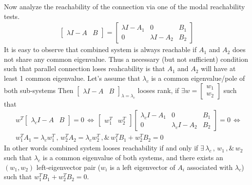 \documentclass[twoside]{article}
\begin{document}
Now analyze the reachability of the connection via one of the modal reachability tests. 
%
\begin{align*}
	\left[ \begin{array}{c|c} \lambda I - A & B \end{array} \right]
	= 
	\left[ \begin{array}{c|c|c} \lambda I - A_1 & 0 & B_1 \\ \hline 0 &  \lambda I - A_2 & B_2 
	\end{array} \right]
\end{align*}
%
It is easy to observe that combined system is always reachable if $A_1$ 
and $A_2$ does not share any common eigenvalue. Thus a necessary (but not sufficient) condition 
such that parallel connection loses reahcability is that $A_1$ and $A_2$ will have at least 1 
common eigenvalue. Let's assume that $\lambda_c$ is a common eigenvalue/pole of both sub-systems
Then $\left[ \begin{array}{c|c} \lambda I - A & B \end{array} \right]_{\lambda = \lambda_c}$ 
looses rank, if $\exists w = \begin{bmatrix} w_1 \\ w_2 \end{bmatrix}$ such that 
%
%
\begin{align*}
	&w^T \left[ \begin{array}{c|c} \lambda_c I - A & B \end{array} \right] = 0 
	\, \iff \,  \begin{bmatrix} w_1^T & w_2^T \end{bmatrix} \left[ \begin{array}{c|c|c} \lambda_c I - A_1 & 0 & B_1  \\ \hline 0 &  \lambda_c I - A_2 & B_2 \end{array} \right]  = 0
	\, \iff \, 
	\\
	&w_1^T A_1 = \lambda_c w_1^T \, , \, w_2^T A_2 = \lambda_c w_2^T \, , \& \, w_1^T B_1 + w_2^T B_2 = 0
\end{align*}
%
In other words combined system looses reachability if and only if $\exists \, \lambda_c  \, , \, w_1 \, ,\& \, w_2$ such that 
$\lambda_c$ is a common eigenvalue of both systems, and there exists an $(w_1,w_2)$ left-eigenvector pair ($w_i$ is a left eigenvector of $A_i$ associated with $\lambda_c$)
such that $w_1^T B_1 + w_2^T B_2 = 0$.










\end{document}
